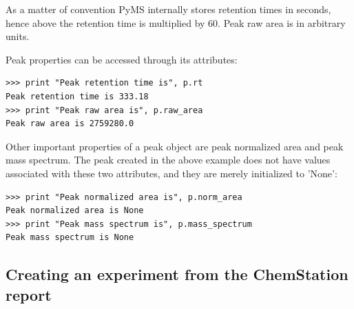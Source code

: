 \noindent
As a matter of convention PyMS internally stores retention times in
seconds, hence above the retention time is multiplied by 60. Peak
raw area is in arbitrary units.

Peak properties can be accessed through its attributes:

\begin{verbatim}
>>> print "Peak retention time is", p.rt
Peak retention time is 333.18
>>> print "Peak raw area is", p.raw_area
Peak raw area is 2759280.0
\end{verbatim}

\noindent
Other important properties of a peak object are peak normalized area
and peak mass spectrum. The peak created in the above example does
not have values associated with these two attributes, and they are
merely initialized to 'None':

\begin{verbatim}
>>> print "Peak normalized area is", p.norm_area
Peak normalized area is None
>>> print "Peak mass spectrum is", p.mass_spectrum
Peak mass spectrum is None
\end{verbatim}

\noindent


\subsection{Creating an experiment from the ChemStation report}


